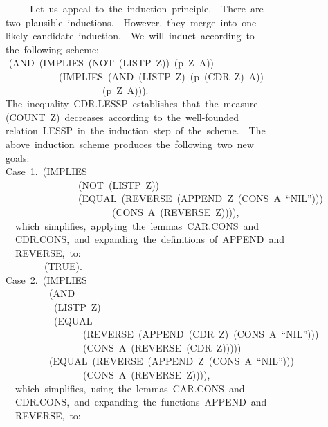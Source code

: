 \documentclass[10pt]{book}
\newenvironment{pubasis}{\begin{flushleft}}{\end{flushleft}}
\begin{document}
\begin{pubasis}
~~~~~~~Let~us~appeal~to~the~induction~principle.~~There~are\\
~~two~plausible~inductions.~~However,~they~merge~into~one\\
~~likely~candidate~induction.~~We~will~induct~according~to\\
~~the~following~scheme:\\
~~	(AND~(IMPLIES~(NOT~(LISTP~Z))~(p~Z~A))\\
~~~~~~~~~~~~~(IMPLIES~(AND~(LISTP~Z)~(p~(CDR~Z)~A))\\
~~~~~~~~~~~~~~~~~~~~~~(p~Z~A))).\\
~~The~inequality~CDR.LESSP~establishes~that~the~measure\\
~~(COUNT~Z)~decreases~according~to~the~well-founded\\
~~relation~LESSP~in~the~induction~step~of~the~scheme.~~The\\
~~above~induction~scheme~produces~the~following~two~new\\
~~goals:\\

~~Case~1.~(IMPLIES\\
~~~~~~~~~~~~~~~~~(NOT~(LISTP~Z))\\
~~~~~~~~~~~~~~~~~(EQUAL~(REVERSE~(APPEND~Z~(CONS~A~``NIL'')))\\
~~~~~~~~~~~~~~~~~~~~~~~~(CONS~A~(REVERSE~Z)))),\\

~~~~which~simplifies,~applying~the~lemmas~CAR.CONS~and\\
~~~~CDR.CONS,~and~expanding~the~definitions~of~APPEND~and\\
~~~~REVERSE,~to:\\

~~~~~~~~~~(TRUE).\\

~~Case~2.~(IMPLIES\\
~~~~~~~~~~~(AND\\
~~~~~~~~~~~~(LISTP~Z)\\
~~~~~~~~~~~~(EQUAL\\
~~~~~~~~~~~~~~~~~~(REVERSE~(APPEND~(CDR~Z)~(CONS~A~``NIL'')))\\
~~~~~~~~~~~~~~~~~~(CONS~A~(REVERSE~(CDR~Z)))))\\
~~~~~~~~~~~(EQUAL~(REVERSE~(APPEND~Z~(CONS~A~``NIL'')))\\
~~~~~~~~~~~~~~~~~~(CONS~A~(REVERSE~Z)))),\\

~~~~which~simplifies,~using~the~lemmas~CAR.CONS~and\\
~~~~CDR.CONS,~and~expanding~the~functions~APPEND~and\\
~~~~REVERSE,~to:\\


\end{pubasis}
\end{document}
